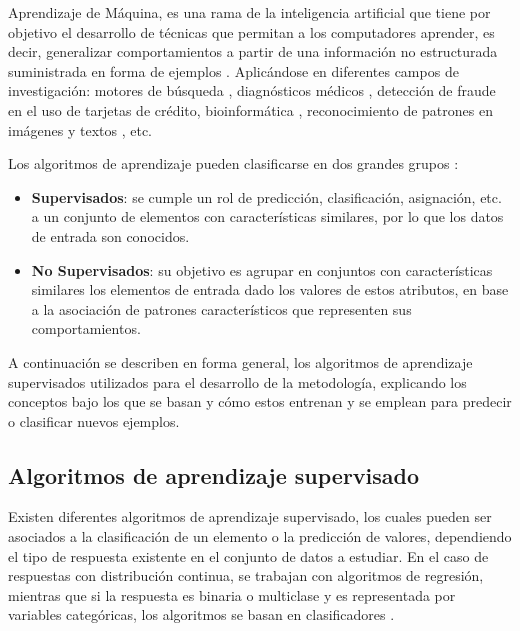 Aprendizaje de Máquina, es una rama de la inteligencia artificial que tiene por objetivo el desarrollo de técnicas que permitan a los computadores aprender, es decir, generalizar comportamientos a partir de una información no estructurada suministrada en forma de ejemplos \cite{michie1994machine}. Aplicándose en diferentes campos de investigación: motores de búsqueda \cite{cooley1997web}, diagnósticos médicos \cite{7912315,ABDELAZIZ2018117}, detección de fraude en el uso de tarjetas de crédito, bioinformática \cite{juanito}, reconocimiento de patrones en imágenes \cite{imageA} y textos \cite{netzer2011reading,alm2005emotions}, etc. 

Los algoritmos de aprendizaje pueden clasificarse en dos grandes grupos \cite{michie1994machine}:

\begin{itemize}
	
	\item \textbf{Supervisados}: se cumple un rol de predicción, clasificación, asignación, etc. a un conjunto de elementos con características similares, por lo que los datos de entrada son conocidos.
	
	\item \textbf{No Supervisados}: su objetivo es agrupar en conjuntos con características similares los elementos de entrada dado los valores de estos atributos, en base a la asociación de patrones característicos que representen sus comportamientos.
\end{itemize}

A continuación se describen en forma general, los algoritmos de aprendizaje supervisados utilizados para el desarrollo de la metodología, explicando los conceptos bajo los que se basan y cómo estos entrenan y se emplean para predecir o clasificar nuevos ejemplos.

\subsection{Algoritmos de aprendizaje supervisado}

Existen diferentes algoritmos de aprendizaje supervisado, los cuales pueden ser asociados a la clasificación de un elemento o la predicción de valores, dependiendo el tipo de respuesta existente en el conjunto de datos a estudiar. En el caso de respuestas con distribución continua, se trabajan con algoritmos de regresión, mientras que si la respuesta es binaria o multiclase y es representada por variables categóricas, los algoritmos se basan en clasificadores \cite{michie1994machine}.

